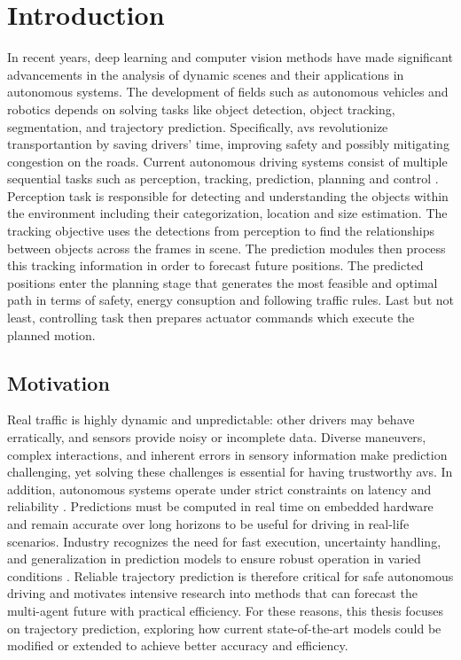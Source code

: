 \chapter{Introduction}
\label{chapter:intro}


In recent years, deep learning and computer vision methods have made significant advancements in the analysis 
of dynamic scenes and their applications in autonomous systems. The development of fields such as autonomous 
vehicles and robotics depends on solving tasks like object detection, object tracking, segmentation, and 
trajectory prediction. Specifically, \ac{avs} revolutionize transportantion by saving drivers' time, improving safety and
possibly mitigating congestion on the roads. Current autonomous driving systems consist of multiple sequential tasks such as perception,
tracking, prediction, planning and control \cite{chen2024end}. Perception task is responsible for detecting and understanding
the objects within the environment including their categorization, location and size estimation. The tracking objective
uses the detections from perception to find the relationships between objects across the frames in scene. The prediction 
modules then process this tracking information in order to forecast future positions. The predicted positions enter the
planning stage that generates the most feasible and optimal path in terms of safety, energy consuption and following traffic rules.
Last but not least, controlling task then prepares actuator commands which execute the planned motion.

\section{Motivation}
Real traffic is highly dynamic and unpredictable: other drivers may behave erratically, and sensors provide 
noisy or incomplete data. Diverse maneuvers, complex interactions, and inherent errors in sensory information 
make prediction challenging, yet solving these challenges is essential for having trustworthy \ac{avs}. 
In addition, autonomous systems operate under strict constraints on latency and reliability \cite{huang2022survey}. 
Predictions must be computed in real time on embedded hardware and remain accurate over long horizons to be useful 
for driving in real-life scenarios. Industry recognizes the need for fast execution, uncertainty handling, and generalization 
in prediction models to ensure robust operation in varied conditions \cite{Ettinger2021WOMD,Wayformer2022,ISO21448}. 
Reliable trajectory prediction is therefore critical for safe autonomous driving and motivates intensive 
research into methods that can forecast the multi-agent future with practical efficiency. For these reasons, this 
thesis focuses on trajectory prediction, exploring how current state-of-the-art models could be modified or extended
to achieve better accuracy and efficiency.

